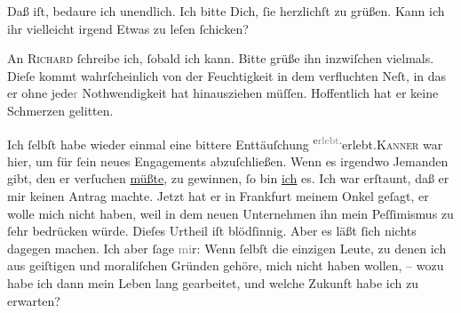 \pstart
           Daß \label{K_L03195-5v}\label{K_L03195-5} iſt, bedaure ich unendlich. Ich bitte Dich,{ }ſie herzlichſt zu grüßen. Kann
               ich ihr vielleicht irgend Etwas zu leſen{ }ſchicken?\pend
           
\pstart
           {\pb}An \textsc{Richard}{ }ſchreibe ich,{ }ſobald ich kann. Bitte grüße ihn inzwiſchen vielmals. Dieſe
                  \label{K_L03195-6v}\label{K_L03195-6} kommt wahrſcheinlich von der Feuchtigkeit in dem verfluchten Neſt, in das er ohne jede\textcolor{gray}{r}
               Nothwendigkeit hat hinausziehen müſſen. Hoffentlich hat er keine Schmerzen
               gelitten.\pend
           
\pstart
           Ich{ }ſelbſt habe wieder einmal eine bittere Enttäuſchung \substVorne{}\textsuperscript{e\textcolor{gray}{rlebt}.}\substDazwischen{}erlebt.\substHinten{}{ }\textsc{Kanner} war hier, um für{ }ſein
               neues \label{K_L03195-7v}\label{K_L03195-7} Engagements  abzuſchließen. Wenn es
               irgendwo Jemanden gibt, den er verſuchen \uline{müßte}, zu
               gewinnen,{ }ſo bin \uline{ich} es. Ich war erſtaunt, daß er mir
               keinen Antrag machte. Jetzt hat er in {\pb}Frankfurt meinem Onkel geſagt, er wolle mich nicht haben,
               weil in dem neuen Unternehmen
               ihn mein Peſſimismus zu{ }ſehr bedrücken würde. 
               Dieſes Urtheil iſt blödſinnig. Aber es läßt{ }ſich nichts dagegen machen. Ich aber{ }ſage
                  \textcolor{gray}{mi}r: Wenn{ }ſelbſt die einzigen Leute,  zu denen ich aus geiſtigen und moraliſchen Gründen gehöre,
               mich nicht haben wollen, – wozu habe ich dann mein Leben lang gearbeitet, und welche
               Zukunft habe ich zu erwarten?\pend
           
